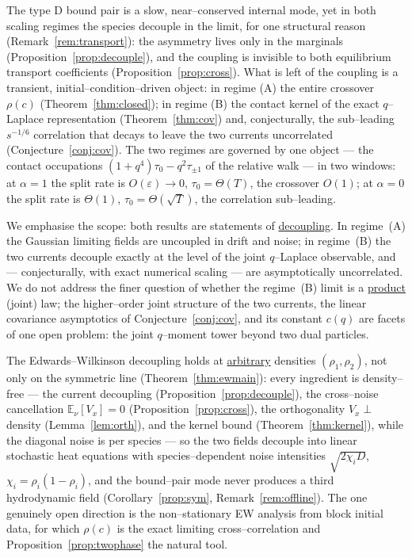\documentclass[11pt]{article}
\theoremstyle{plain}
\theoremstyle{definition}
\theoremstyle{remark}
\newcommand{\E}{\mathbb{E}}\newcommand{\PP}{\mathbb{P}}\newcommand{\dd}{\,\mathrm{d}}
\newcommand{\eps}{\varepsilon}\newcommand{\Exp}{\mathrm{Exp}}
\begin{document}
The type D bound pair is a slow, near--conserved internal mode, yet in both scaling
regimes the species decouple in the limit, for one structural reason
(Remark~\ref{rem:transport}): the asymmetry lives only in the marginals
(Proposition~\ref{prop:decouple}), and the coupling is invisible to both equilibrium
transport coefficients (Proposition~\ref{prop:cross}). What is left of the coupling is a
transient, initial--condition--driven object: in regime (A) the entire crossover
$\rho(c)$ (Theorem~\ref{thm:closed}); in regime (B) the contact kernel of the exact
$q$--Laplace representation (Theorem~\ref{thm:cov}) and, conjecturally, the
sub--leading $s^{-1/6}$ correlation that decays to leave the two currents
uncorrelated (Conjecture~\ref{conj:cov}).
The two regimes are governed by one object --- the contact occupations
$(1+q^4)\tau_0-q^2\tau_{\pm1}$ of the relative walk --- in two
windows: at $\alpha=1$ the split rate is
$O(\eps)\to0$, $\tau_0=\Theta(T)$, the crossover $O(1)$; at $\alpha=0$ the split rate
is $\Theta(1)$, $\tau_0=\Theta(\sqrt T)$, the correlation sub--leading.

We emphasise the scope: both results are statements of \underline{decoupling}. In regime~(A)
the Gaussian limiting fields are uncoupled in drift and noise; in regime~(B) the two
currents decouple exactly at the level of the joint $q$--Laplace observable, and ---
conjecturally, with exact numerical scaling --- are asymptotically uncorrelated. We
do not address the finer question of whether the regime~(B) limit is a \underline{product}
(joint) law; the higher--order joint structure of the two currents, the linear
covariance asymptotics of Conjecture~\ref{conj:cov}, and its constant $c(q)$ are
facets of one open problem: the joint $q$--moment tower beyond two dual particles.

The Edwards--Wilkinson decoupling holds at \underline{arbitrary} densities $(\rho_1,\rho_2)$,
not only on the symmetric line (Theorem~\ref{thm:ewmain}): every ingredient is
density--free --- the current decoupling (Proposition~\ref{prop:decouple}), the
cross--noise cancellation $\E_\nu[V_x]=0$ (Proposition~\ref{prop:cross}), the
orthogonality $V_x\perp$ density (Lemma~\ref{lem:orth}), and the kernel bound
(Theorem~\ref{thm:kernel}), while the diagonal noise is per species --- so the two
fields decouple into linear stochastic heat equations with species--dependent noise
intensities $\sqrt{2\chi_iD}$, $\chi_i=\rho_i(1-\rho_i)$, and the bound--pair mode never
produces a third hydrodynamic field (Corollary~\ref{prop:sym}, Remark~\ref{rem:offline}).
The one genuinely open direction is the non--stationary EW analysis from block initial
data, for which $\rho(c)$ is the exact limiting cross--correlation and
Proposition~\ref{prop:twophase} the natural tool.
\end{document}
